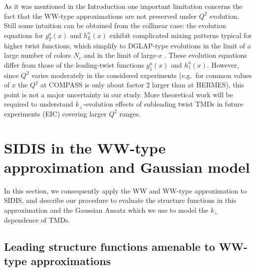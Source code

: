 \documentclass[a4paper,11pt]{article}
\newcommand{\blue}[1]{{\color{blue} #1}}
\newcommand{\orange}[1]{{\color{orange}#1}}
\newcommand{\ak}[1]{\orange{#1}}
\newcommand{\ps}[1]{\blue{#1}}
\newcommand{\bp}[1]{{\color[rgb]{0,0.65,0.35}#1}}
\begin{document}
\ak{As it was mentioned in the Introduction}
\ps{one important limitation concerns the fact that the WW-type approximations
are not preserved under $Q^2$ evolution. \ak{Still} some intuition can be 
obtained from the collinear case: the evolution equations for $g_T^a(x)$ 
and $h_L^a(x)$ exhibit complicated mixing patterns typical for higher 
twist functions, which simplify to DGLAP-type evolutions in the limit 
of a large number of colors $N_c$ and in the limit of large-$x$ 
\cite{Ali:1991em,Koike:1994st,Balitsky:1996uh,Belitsky:1997zw}. 
These evolution equations differ from those of the leading-twist
functions $g_1^a(x)$ and $h_1^a(x)$. 
\bp{However, since $Q^2$ varies moderately in the considered experiments 
(e.g.\ for common values of $x$ the $Q^2$ at COMPASS is only about factor 2 
larger than at HERMES), this point is not a major uncertainty in our study.
More theoretical work will be required to understand $k_\perp$-evolution 
effects of subleading twist TMDs in future experiments (EIC) 
covering larger $Q^2$ ranges.}}



%
\section{SIDIS in the WW-type approximation and Gaussian model}
\label{Sec-4:SIDIS-in-WW-approximation}

In this section, we consequently apply the WW and WW-type approximation
to SIDIS, and describe our procedure to evaluate the structure
functions in this approximation and the Gaussian Ansatz which we use
to model the $k_\perp$ dependence of TMDs.

\subsection{Leading structure functions amenable to WW-type approximations}
\label{Sec-4.1:WW-twist-2}
\end{document}
